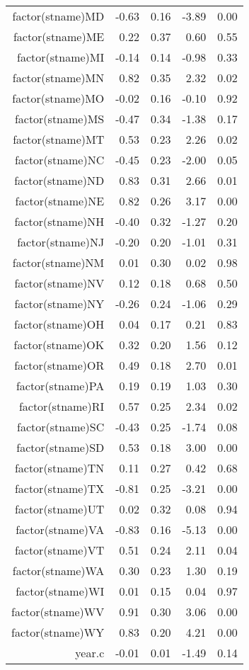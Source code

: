 \begin{table}[ht]
\begin{tabular}{rrrrr}
  factor(stname)MD & -0.63 & 0.16 & -3.89 & 0.00 \\ 
  factor(stname)ME & 0.22 & 0.37 & 0.60 & 0.55 \\ 
  factor(stname)MI & -0.14 & 0.14 & -0.98 & 0.33 \\ 
  factor(stname)MN & 0.82 & 0.35 & 2.32 & 0.02 \\ 
  factor(stname)MO & -0.02 & 0.16 & -0.10 & 0.92 \\ 
  factor(stname)MS & -0.47 & 0.34 & -1.38 & 0.17 \\ 
  factor(stname)MT & 0.53 & 0.23 & 2.26 & 0.02 \\ 
  factor(stname)NC & -0.45 & 0.23 & -2.00 & 0.05 \\ 
  factor(stname)ND & 0.83 & 0.31 & 2.66 & 0.01 \\ 
  factor(stname)NE & 0.82 & 0.26 & 3.17 & 0.00 \\ 
  factor(stname)NH & -0.40 & 0.32 & -1.27 & 0.20 \\ 
  factor(stname)NJ & -0.20 & 0.20 & -1.01 & 0.31 \\ 
  factor(stname)NM & 0.01 & 0.30 & 0.02 & 0.98 \\ 
  factor(stname)NV & 0.12 & 0.18 & 0.68 & 0.50 \\ 
  factor(stname)NY & -0.26 & 0.24 & -1.06 & 0.29 \\ 
  factor(stname)OH & 0.04 & 0.17 & 0.21 & 0.83 \\ 
  factor(stname)OK & 0.32 & 0.20 & 1.56 & 0.12 \\ 
  factor(stname)OR & 0.49 & 0.18 & 2.70 & 0.01 \\ 
  factor(stname)PA & 0.19 & 0.19 & 1.03 & 0.30 \\ 
  factor(stname)RI & 0.57 & 0.25 & 2.34 & 0.02 \\ 
  factor(stname)SC & -0.43 & 0.25 & -1.74 & 0.08 \\ 
  factor(stname)SD & 0.53 & 0.18 & 3.00 & 0.00 \\ 
  factor(stname)TN & 0.11 & 0.27 & 0.42 & 0.68 \\ 
  factor(stname)TX & -0.81 & 0.25 & -3.21 & 0.00 \\ 
  factor(stname)UT & 0.02 & 0.32 & 0.08 & 0.94 \\ 
  factor(stname)VA & -0.83 & 0.16 & -5.13 & 0.00 \\ 
  factor(stname)VT & 0.51 & 0.24 & 2.11 & 0.04 \\ 
  factor(stname)WA & 0.30 & 0.23 & 1.30 & 0.19 \\ 
  factor(stname)WI & 0.01 & 0.15 & 0.04 & 0.97 \\ 
  factor(stname)WV & 0.91 & 0.30 & 3.06 & 0.00 \\ 
  factor(stname)WY & 0.83 & 0.20 & 4.21 & 0.00 \\ 
  year.c & -0.01 & 0.01 & -1.49 & 0.14 \\ 
   \hline
\end{tabular}
\end{table}
